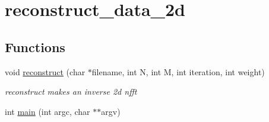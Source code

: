 \hypertarget{group__applications__mri2d__reconstruct__data__2d}{
\section{reconstruct\_\-data\_\-2d}
\label{group__applications__mri2d__reconstruct__data__2d}
}
\subsection*{Functions}
\begin{CompactItemize}
\item 
\hypertarget{group__applications__mri2d__reconstruct__data__2d_g43c01bb9865574fcfee9a1f999713987}{
void \hyperlink{group__applications__mri2d__reconstruct__data__2d_g43c01bb9865574fcfee9a1f999713987}{reconstruct} (char $\ast$filename, int N, int M, int iteration, int weight)}
\label{group__applications__mri2d__reconstruct__data__2d_g43c01bb9865574fcfee9a1f999713987}

\begin{CompactList}\small\item\em reconstruct makes an inverse 2d nfft \item\end{CompactList}\item 
\hypertarget{group__applications__mri2d__reconstruct__data__2d_g3c04138a5bfe5d72780bb7e82a18e627}{
int \hyperlink{group__applications__mri2d__reconstruct__data__2d_g3c04138a5bfe5d72780bb7e82a18e627}{main} (int argc, char $\ast$$\ast$argv)}
\label{group__applications__mri2d__reconstruct__data__2d_g3c04138a5bfe5d72780bb7e82a18e627}

\end{CompactItemize}
